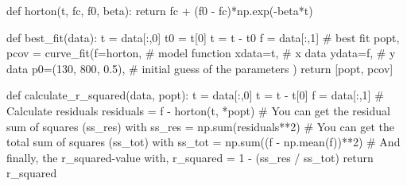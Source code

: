 \documentclass[
  letterpaper,
  DIV=11,
  numbers=noendperiod]{scrreprt}
\newenvironment{Shaded}{\begin{snugshade}}{\end{snugshade}}
\newcommand{\BuiltInTok}[1]{\textcolor[rgb]{0.00,0.23,0.31}{#1}}
\newcommand{\CommentTok}[1]{\textcolor[rgb]{0.37,0.37,0.37}{#1}}
\newcommand{\ControlFlowTok}[1]{\textcolor[rgb]{0.00,0.23,0.31}{#1}}
\newcommand{\DecValTok}[1]{\textcolor[rgb]{0.68,0.00,0.00}{#1}}
\newcommand{\FloatTok}[1]{\textcolor[rgb]{0.68,0.00,0.00}{#1}}
\newcommand{\KeywordTok}[1]{\textcolor[rgb]{0.00,0.23,0.31}{#1}}
\newcommand{\NormalTok}[1]{\textcolor[rgb]{0.00,0.23,0.31}{#1}}
\newcommand{\OperatorTok}[1]{\textcolor[rgb]{0.37,0.37,0.37}{#1}}
\begin{document}
\begin{Shaded}
\begin{Highlighting}[]
\KeywordTok{def}\NormalTok{ horton(t, fc, f0, beta):}
    \ControlFlowTok{return}\NormalTok{ fc }\OperatorTok{+}\NormalTok{ (f0 }\OperatorTok{{-}}\NormalTok{ fc)}\OperatorTok{*}\NormalTok{np.exp(}\OperatorTok{{-}}\NormalTok{beta}\OperatorTok{*}\NormalTok{t)}

\KeywordTok{def}\NormalTok{ best\_fit(data):}
\NormalTok{    t }\OperatorTok{=}\NormalTok{ data[:,}\DecValTok{0}\NormalTok{]}
\NormalTok{    t0 }\OperatorTok{=}\NormalTok{ t[}\DecValTok{0}\NormalTok{]}
\NormalTok{    t }\OperatorTok{=}\NormalTok{ t }\OperatorTok{{-}}\NormalTok{ t0}
\NormalTok{    f }\OperatorTok{=}\NormalTok{ data[:,}\DecValTok{1}\NormalTok{]}
    \CommentTok{\# best fit}
\NormalTok{    popt, pcov }\OperatorTok{=}\NormalTok{ curve\_fit(f}\OperatorTok{=}\NormalTok{horton,             }\CommentTok{\# model function}
\NormalTok{                           xdata}\OperatorTok{=}\NormalTok{t,              }\CommentTok{\# x data}
\NormalTok{                           ydata}\OperatorTok{=}\NormalTok{f,              }\CommentTok{\# y data}
\NormalTok{                           p0}\OperatorTok{=}\NormalTok{(}\DecValTok{130}\NormalTok{, }\DecValTok{800}\NormalTok{, }\FloatTok{0.5}\NormalTok{),   }\CommentTok{\# initial guess of the parameters}
\NormalTok{                          )}
    \ControlFlowTok{return}\NormalTok{ [popt, pcov]}

\KeywordTok{def}\NormalTok{ calculate\_r\_squared(data, popt):}
\NormalTok{    t }\OperatorTok{=}\NormalTok{ data[:,}\DecValTok{0}\NormalTok{]}
\NormalTok{    t }\OperatorTok{=}\NormalTok{ t }\OperatorTok{{-}}\NormalTok{ t[}\DecValTok{0}\NormalTok{]}
\NormalTok{    f }\OperatorTok{=}\NormalTok{ data[:,}\DecValTok{1}\NormalTok{]}
    \CommentTok{\# Calculate residuals}
\NormalTok{    residuals }\OperatorTok{=}\NormalTok{ f }\OperatorTok{{-}}\NormalTok{ horton(t, }\OperatorTok{*}\NormalTok{popt)}
    \CommentTok{\# You can get the residual sum of squares (ss\_res) with}
\NormalTok{    ss\_res }\OperatorTok{=}\NormalTok{ np.}\BuiltInTok{sum}\NormalTok{(residuals}\OperatorTok{**}\DecValTok{2}\NormalTok{)}
    \CommentTok{\# You can get the total sum of squares (ss\_tot) with}
\NormalTok{    ss\_tot }\OperatorTok{=}\NormalTok{ np.}\BuiltInTok{sum}\NormalTok{((f }\OperatorTok{{-}}\NormalTok{ np.mean(f))}\OperatorTok{**}\DecValTok{2}\NormalTok{)}
    \CommentTok{\# And finally, the r\_squared{-}value with,}
\NormalTok{    r\_squared }\OperatorTok{=} \DecValTok{1} \OperatorTok{{-}}\NormalTok{ (ss\_res }\OperatorTok{/}\NormalTok{ ss\_tot)}
    \ControlFlowTok{return}\NormalTok{ r\_squared}


\end{Highlighting}
\end{Shaded}
\end{document}
